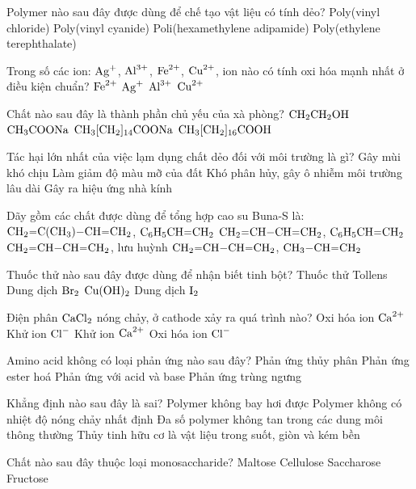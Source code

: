 \documentclass[11pt,a4paper]{article}
\begin{document}
\begin{ex}
Polymer nào sau đây được dùng để chế tạo vật liệu có tính dẻo?
\choice
{\True Poly(vinyl chloride)}
{Poly(vinyl cyanide)}
{Poli(hexamethylene adipamide)}
{Poly(ethylene terephthalate)}
\end{ex}
\begin{ex}
Trong số các ion: $\ce{Ag+}$, $\ce{Al^3+}$, $\ce{Fe^2+}$, $\ce{Cu^2+}$, ion nào có tính oxi hóa mạnh nhất ở điều kiện chuẩn?
\choice
{$\ce{Fe^2+}$}
{\True $\ce{Ag+}$}
{$\ce{Al^3+}$}
{$\ce{Cu^2+}$}
\end{ex}
\begin{ex}
Chất nào sau đây là thành phần chủ yếu của xà phòng?
\choice
{$\ce{CH2CH2OH}$}
{$\ce{CH3COONa}$}
{\True $\ce{CH3[CH2]14COONa}$}
{$\ce{CH3[CH2]16COOH}$}
\end{ex}
\begin{ex}
Tác hại lớn nhất của việc lạm dụng chất dẻo đối với môi trường là gì?
\choice
{Gây mùi khó chịu}
{Làm giảm độ màu mỡ của đất}
{\True Khó phân hủy, gây ô nhiễm môi trường lâu dài}
{Gây ra hiệu ứng nhà kính}
\end{ex}
\begin{ex}
Dãy gồm các chất được dùng để tổng hợp cao su Buna-S là:
\choice
{$\ce{CH2=C(CH3)-CH=CH2}$, $\ce{C6H5CH=CH2}$}
{\True $\ce{CH2=CH-CH=CH2}$, $\ce{C6H5CH=CH2}$}
{$\ce{CH2=CH-CH=CH2}$, lưu huỳnh}
{$\ce{CH2=CH-CH=CH2}$, $\ce{CH3-CH=CH2}$}
\end{ex}
\begin{ex}
Thuốc thử nào sau đây được dùng để nhận biết tinh bột?
\choice
{Thuốc thử Tollens}
{Dung dịch $\ce{Br2}$}
{$\ce{Cu(OH)2}$}
{\True Dung dịch $\ce{I2}$}
\end{ex}
\begin{ex}
Điện phân $\ce{CaCl2}$ nóng chảy, ở cathode xảy ra quá trình nào?
\choice
{Oxi hóa ion $\ce{Ca^2+}$}
{Khử ion $\ce{Cl-}$}
{\True Khử ion $\ce{Ca^2+}$}
{Oxi hóa ion $\ce{Cl-}$}
\end{ex}
\begin{ex}
Amino acid không có loại phản ứng nào sau đây?
\choice
{\True Phản ứng thủy phân}
{Phản ứng ester hoá}
{Phản ứng với acid và base}
{Phản ứng trùng ngưng}
\end{ex}
\begin{ex}
Khẳng định nào sau đây là sai?
\choice
{Polymer không bay hơi được}
{Polymer không có nhiệt độ nóng chảy nhất định}
{Đa số polymer không tan trong các dung môi thông thường}
{\True Thủy tinh hữu cơ là vật liệu trong suốt, giòn và kém bền}
\end{ex}
\begin{ex}
Chất nào sau đây thuộc loại monosaccharide?
\choice
{Maltose}
{Cellulose}
{Saccharose}
{\True Fructose}
\end{ex}
\end{document}
